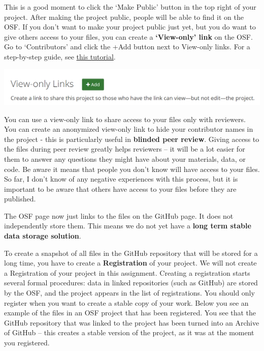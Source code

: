 \documentclass[
  oneside]{book}
\begin{document}
This is a good moment to click the `Make Public' button in the top right of your
project. After making the project public, people will be able to find it on the
OSF. If you don't want to make your project public just yet, but you do want to
give others access to your files, you can create a \textbf{`View-only' link} on the
OSF. Go to `Contributors' and click the +Add button next to View-only links. For
a step-by-step guide, see \href{https://help.osf.io/hc/en-us/articles/360019930333-Create-a-View-only-Link-for-a-Project}{this
tutorial}.

\begin{center}\includegraphics[width=1\linewidth]{images/fd54022300a51d07de93673aac3fb508} \end{center}

You can use a view-only link to share access to your files only with reviewers. You can create an anonymized view-only link to hide your contributor names in the project - this is particularly useful in \textbf{blinded peer review}. Giving access to the files during peer review greatly helps reviewers -- it will be a lot easier for them to answer any questions they might have about your materials, data, or code. Be aware it means that people you don't know will have access to your files. So far, I don't know of any negative experiences with this process, but it is important to be aware that others have access to your files before they are published.

The OSF page now just links to the files on the GitHub page. It does not independently store them. This means we do not yet have a \textbf{long term stable data storage solution}.

To create a snapshot of all files in the GitHub repository that will be stored for a long time, you have to create a \textbf{Registration} of your project. We will not create a Registration of your project in this assignment. Creating a registration starts several formal procedures: data in linked repositories (such as GitHub) are stored by the OSF, and the project appears in the list of registrations. You should only register when you want to create a stable copy of your work. Below you see an example of the files in an OSF project that has been registered. You see that the GitHub repository that was linked to the project has been turned into an Archive of GitHub -- this creates a stable version of the project, as it was at the moment you registered.
\end{document}
